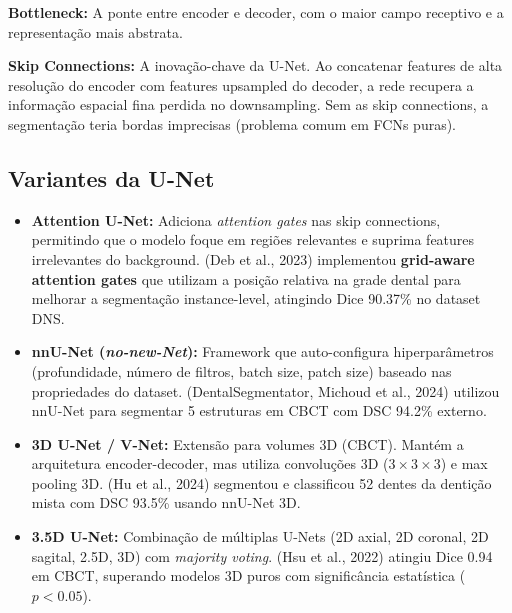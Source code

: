 \textbf{Bottleneck:} A ponte entre encoder e decoder, com o maior campo
receptivo e a representação mais abstrata.

\textbf{Skip Connections:} A inovação-chave da U-Net. Ao concatenar features
de alta resolução do encoder com features upsampled do decoder, a rede recupera
a informação espacial fina perdida no downsampling. Sem as skip connections,
a segmentação teria bordas imprecisas (problema comum em FCNs puras).


\subsection{Variantes da U-Net}

\begin{itemize}
  \item \textbf{Attention U-Net:} Adiciona \textit{attention gates} nas skip
        connections, permitindo que o modelo foque em regiões relevantes e
        suprima features irrelevantes do background. 
        (Deb et al., 2023) implementou \textbf{grid-aware attention gates}
        que utilizam a posição relativa na grade dental para melhorar a
        segmentação instance-level, atingindo Dice 90.37\% no dataset DNS.

  \item \textbf{nnU-Net (\textit{no-new-Net}):} Framework que auto-configura
        hiperparâmetros (profundidade, número de filtros, batch size,
        patch size) baseado nas propriedades do dataset. 
        (DentalSegmentator, Michoud et al., 2024) utilizou nnU-Net para
        segmentar 5 estruturas em CBCT com DSC 94.2\% externo.

  \item \textbf{3D U-Net / V-Net:} Extensão para volumes 3D (CBCT). Mantém
        a arquitetura encoder-decoder, mas utiliza convoluções 3D ($3\times3\times3$)
        e max pooling 3D.  (Hu et al., 2024) segmentou
        e classificou 52 dentes da dentição mista com DSC 93.5\% usando nnU-Net 3D.

  \item \textbf{3.5D U-Net:} Combinação de múltiplas U-Nets (2D axial,
        2D coronal, 2D sagital, 2.5D, 3D) com \textit{majority voting}.
         (Hsu et al., 2022) atingiu Dice 0.94 em CBCT,
        superando modelos 3D puros com significância estatística ($p < 0.05$).
\end{itemize}

